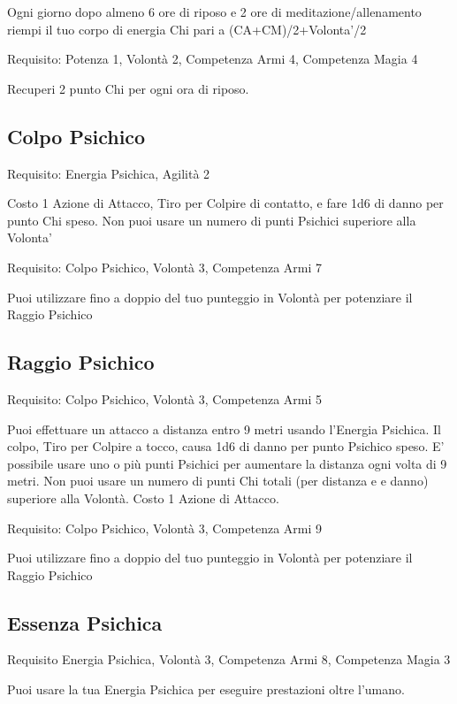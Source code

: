 \documentclass[a4paper,11pt,twoside,openany]{book}
\begin{document}
Ogni giorno dopo almeno 6 ore di riposo e 2 ore di meditazione/allenamento riempi il tuo corpo di energia Chi pari a (CA+CM)/2+Volonta'/2

Requisito: Potenza 1, Volontà 2, Competenza Armi 4, Competenza Magia 4

Recuperi 2 punto Chi per ogni ora di riposo.

\subsection{Colpo Psichico}

Requisito: Energia Psichica, Agilità 2

Costo 1 Azione di Attacco, Tiro per Colpire di contatto, e fare 1d6 di danno per punto Chi speso. Non puoi usare un numero di punti Psichici superiore alla Volonta'

Requisito: Colpo Psichico, Volontà 3, Competenza Armi 7

Puoi utilizzare fino a doppio del tuo punteggio in Volontà per potenziare il Raggio Psichico

\subsection{Raggio Psichico}

Requisito: Colpo Psichico, Volontà 3, Competenza Armi 5

Puoi effettuare un attacco a distanza entro 9 metri usando l'Energia Psichica.
Il colpo, Tiro per Colpire a tocco, causa 1d6 di danno per punto Psichico speso. E' possibile usare uno o più punti Psichici per aumentare la distanza ogni volta di 9 metri.
Non puoi usare un numero di punti Chi totali (per distanza e e danno) superiore alla Volontà. Costo 1 Azione di Attacco.

Requisito: Colpo Psichico, Volontà 3, Competenza Armi 9

Puoi utilizzare fino a doppio del tuo punteggio in Volontà per potenziare il Raggio Psichico

\subsection{Essenza Psichica}

Requisito Energia Psichica, Volontà 3, Competenza Armi 8, Competenza Magia 3

Puoi usare la tua Energia Psichica per eseguire prestazioni oltre l'umano.
\end{document}
